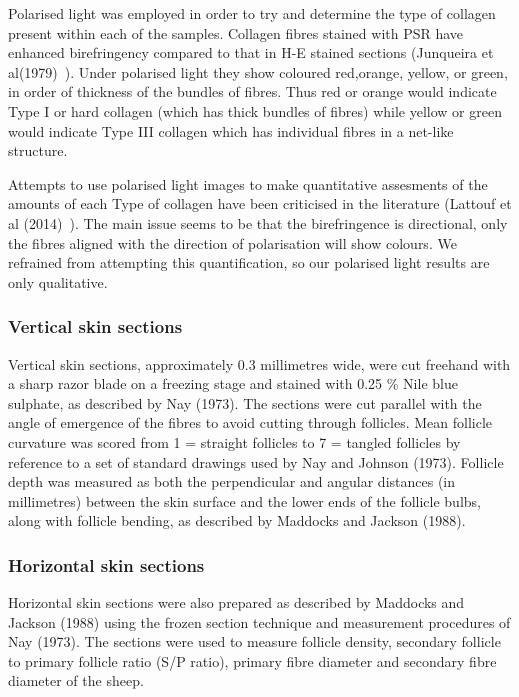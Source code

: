 \documentclass[titlepage]{article}  %
\begin{document}
Polarised light was employed in order to try and determine the type of
collagen present within each of the samples.
Collagen fibres stained with PSR have enhanced birefringency compared to that in H-E stained sections (Junqueira et al(1979)~\cite{junq:79}). Under polarised light they show coloured red,orange, yellow, or green, in order of thickness of the bundles of fibres. Thus red or orange would indicate Type I or hard collagen (which has thick bundles of fibres) while yellow or green would indicate Type III collagen which has individual fibres in a net-like structure.

Attempts to use polarised light images to make quantitative assesments of the amounts of each Type of collagen have been criticised in the literature (Lattouf et al (2014)~\cite{latt:14}).  The main issue seems to be that the birefringence is directional, only the fibres aligned with the direction of polarisation will show colours. We refrained from attempting this quantification, so our polarised light results are only qualitative.


\subsubsection{Vertical skin sections}
Vertical skin sections, approximately 0.3 millimetres wide, were cut
freehand with a sharp razor blade on a freezing stage and stained with
0.25 \% Nile blue sulphate, as described by Nay (1973).
The sections were cut parallel with the angle of
emergence of the fibres to avoid cutting through follicles. Mean
follicle curvature was scored from 1 = straight follicles to 7 =
tangled follicles by reference to a set of standard drawings used by
Nay and Johnson (1973). Follicle depth was measured
as both the perpendicular and angular distances (in millimetres)
between the skin surface and the lower ends of the follicle bulbs,
along with follicle bending, as described by Maddocks and Jackson
(1988).


\subsubsection{Horizontal skin sections}
Horizontal skin sections were also prepared as described by
Maddocks and Jackson (1988) using the frozen section technique and
measurement procedures of Nay (1973). The sections were used to measure
follicle density, secondary follicle to primary follicle ratio (S/P
ratio), primary fibre diameter and secondary fibre diameter of the
sheep.
\end{document}
